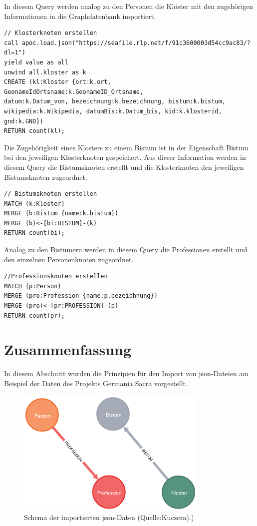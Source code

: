 \documentclass[ngerman,]{scrreprt}
\begin{document}
In diesem Query werden analog zu den Personen die Klöster mit den zugehörigen Informationen in die Graphdatenbank importiert.

\begin{verbatim}
// Klosterknoten erstellen
call apoc.load.json("https://seafile.rlp.net/f/91c3600003d54cc9ac83/?dl=1")
yield value as all
unwind all.kloster as k
CREATE (kl:Kloster {ort:k.ort,
GeonameIdOrtsname:k.GeonameID_Ortsname,
datum:k.Datum_von, bezeichnung:k.bezeichnung, bistum:k.bistum,
wikipedia:k.Wikipedia, datumBis:k.Datum_bis, kid:k.klosterid, gnd:k.GND})
RETURN count(kl);
\end{verbatim}

Die Zugehörigkeit eines Klosters zu einem Bistum ist in der Eigenschaft Bistum bei den jeweiligen Klosterknoten gespeichert. Aus dieser Information werden in diesem Query die Bistumsknoten erstellt und die Klosterknoten den jeweiligen Bistumsknoten zugeordnet.

\begin{verbatim}
// Bistumsknoten erstellen
MATCH (k:Kloster)
MERGE (b:Bistum {name:k.bistum})
MERGE (b)<-[bi:BISTUM]-(k)
RETURN count(bi);
\end{verbatim}

Analog zu den Bistumern werden in diesem Query die Professionen erstellt und den einzelnen Personenknoten zugeordnet.

\begin{verbatim}
//Professionsknoten erstellen
MATCH (p:Person)
MERGE (pro:Profession {name:p.bezeichnung})
MERGE (pro)<-[pr:PROFESSION]-(p)
RETURN count(pr);
\end{verbatim}

\section{Zusammenfassung}\label{zusammenfassung-6}

In diesem Abschnitt wurden die Prinzipien für den Import von json-Dateien am Beispiel der Daten des Projekts Germania Sacra vorgestellt.

\begin{figure}
\centering
\includegraphics{Bilder/GS-Schema1.png}
\caption{Schema der importierten json-Daten (Quelle:Kuczera).)}
\end{figure}
\end{document}
